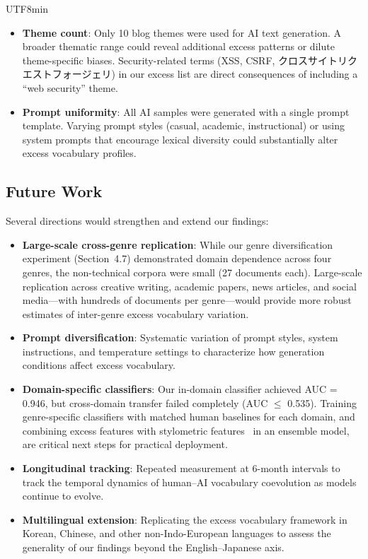 \documentclass[11pt,a4paper]{article}
\begin{document}
\begin{CJK}{UTF8}{min}
\begin{itemize}
    \item \textbf{Theme count}: Only 10 blog themes were used for AI text generation. A broader thematic range could reveal additional excess patterns or dilute theme-specific biases. Security-related terms (XSS, CSRF, クロスサイトリクエストフォージェリ) in our excess list are direct consequences of including a ``web security'' theme.

    \item \textbf{Prompt uniformity}: All AI samples were generated with a single prompt template. Varying prompt styles (casual, academic, instructional) or using system prompts that encourage lexical diversity could substantially alter excess vocabulary profiles.
\end{itemize}

\subsection{Future Work}

Several directions would strengthen and extend our findings:
\begin{itemize}
    \item \textbf{Large-scale cross-genre replication}: While our genre diversification experiment (Section~4.7) demonstrated domain dependence across four genres, the non-technical corpora were small (27 documents each). Large-scale replication across creative writing, academic papers, news articles, and social media---with hundreds of documents per genre---would provide more robust estimates of inter-genre excess vocabulary variation.
    \item \textbf{Prompt diversification}: Systematic variation of prompt styles, system instructions, and temperature settings to characterize how generation conditions affect excess vocabulary.
    \item \textbf{Domain-specific classifiers}: Our in-domain classifier achieved AUC = 0.946, but cross-domain transfer failed completely (AUC $\leq$ 0.535). Training genre-specific classifiers with matched human baselines for each domain, and combining excess features with stylometric features~\citep{zaitsu2025stylometry} in an ensemble model, are critical next steps for practical deployment.
    \item \textbf{Longitudinal tracking}: Repeated measurement at 6-month intervals to track the temporal dynamics of human--AI vocabulary coevolution as models continue to evolve.
    \item \textbf{Multilingual extension}: Replicating the excess vocabulary framework in Korean, Chinese, and other non-Indo-European languages to assess the generality of our findings beyond the English--Japanese axis.
\end{itemize}


\end{CJK}
\end{document}
